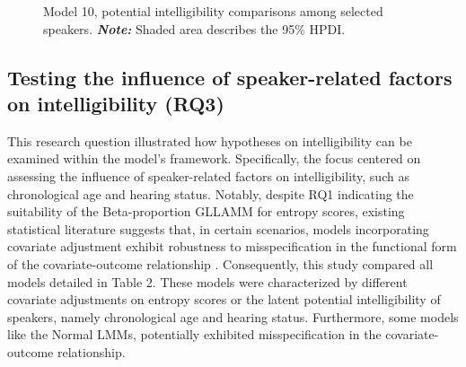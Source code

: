 \documentclass[
  authoryear,
  preprint,
  1p]{elsarticle}
\begin{document}
\label{cell-fig-si_contr_model10}
\begin{figure}[H]


\caption{\label{fig-si_contr_model10}Model 10, potential intelligibility
comparisons among selected speakers. \textbf{\emph{Note:}} Shaded area
describes the 95\% HPDI.}

\end{figure}%

\subsection{Testing the influence of speaker-related factors on
intelligibility (RQ3)}\label{sec-R-RQ3}

This research question illustrated how hypotheses on intelligibility can
be examined within the model's framework. Specifically, the focus
centered on assessing the influence of speaker-related factors on
intelligibility, such as chronological age and hearing status. Notably,
despite RQ1 indicating the suitability of the Beta-proportion GLLAMM for
entropy scores, existing statistical literature suggests that, in
certain scenarios, models incorporating covariate adjustment exhibit
robustness to misspecification in the functional form of the
covariate-outcome relationship \citep{Tackney_et_al_2023}. Consequently,
this study compared all models detailed in Table 2. These models were
characterized by different covariate adjustments on entropy scores or
the latent potential intelligibility of speakers, namely chronological
age and hearing status. Furthermore, some models like the Normal LMMs,
potentially exhibited misspecification in the covariate-outcome
relationship.
\end{document}
